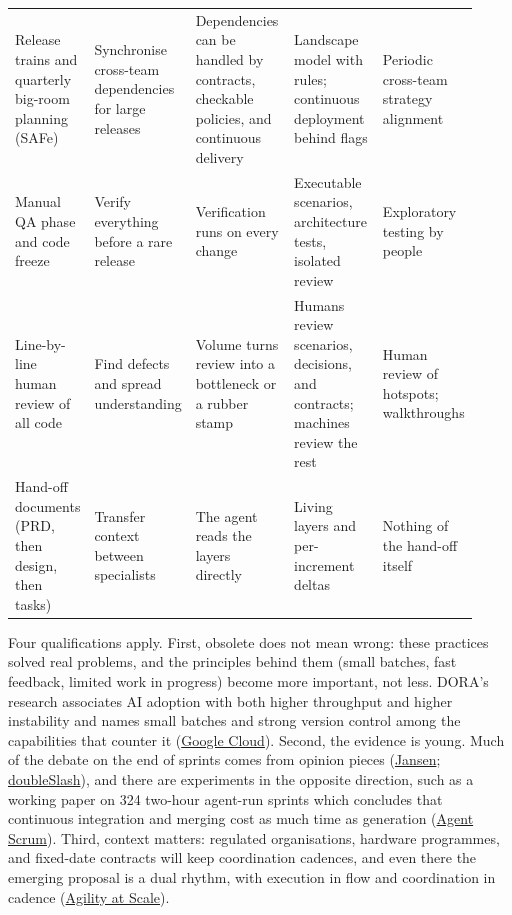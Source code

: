 \documentclass[11pt]{article}
\begin{document}
\begin{longtable}{p{0.16\linewidth}p{0.2\linewidth}p{0.22\linewidth}p{0.2\linewidth}p{0.14\linewidth}}
Release trains and quarterly big-room planning (SAFe) & Synchronise cross-team dependencies for large releases & Dependencies can be handled by contracts, checkable policies, and continuous delivery & Landscape model with rules; continuous deployment behind flags & Periodic cross-team strategy alignment \\
Manual QA phase and code freeze & Verify everything before a rare release & Verification runs on every change & Executable scenarios, architecture tests, isolated review & Exploratory testing by people \\
Line-by-line human review of all code & Find defects and spread understanding & Volume turns review into a bottleneck or a rubber stamp & Humans review scenarios, decisions, and contracts; machines review the rest & Human review of hotspots; walkthroughs \\
Hand-off documents (PRD, then design, then tasks) & Transfer context between specialists & The agent reads the layers directly & Living layers and per-increment deltas & Nothing of the hand-off itself \\
\bottomrule
\end{longtable}
\normalsize

Four qualifications apply. First, obsolete does not mean wrong: these practices solved real problems, and the principles behind them (small batches, fast feedback, limited work in progress) become more important, not less. DORA's research associates AI adoption with both higher throughput and higher instability and names small batches and strong version control among the capabilities that counter it (\href{https://cloud.google.com/blog/products/ai-machine-learning/from-adoption-to-impact-putting-the-dora-ai-capabilities-model-to-work}{Google Cloud}). Second, the evidence is young. Much of the debate on the end of sprints comes from opinion pieces (\href{https://dev.to/remojansen/scrum-is-finally-dead-and-we-have-to-thank-coding-agents-for-that-18bi}{Jansen}; \href{https://blog.doubleslash.de/en/software-technologien/devops/sprints-in-the-ai-age-ai-coding-agents/}{doubleSlash}), and there are experiments in the opposite direction, such as a working paper on 324 two-hour agent-run sprints which concludes that continuous integration and merging cost as much time as generation (\href{https://daveremy.github.io/agent-scrum/}{Agent Scrum}). Third, context matters: regulated organisations, hardware programmes, and fixed-date contracts will keep coordination cadences, and even there the emerging proposal is a dual rhythm, with execution in flow and coordination in cadence (\href{https://agility-at-scale.com/safe/ai-enabled-safe/safe-sprint-cadence-for-ai-teams-the-dual-rhythm-architecture/}{Agility at Scale}).
\end{document}
